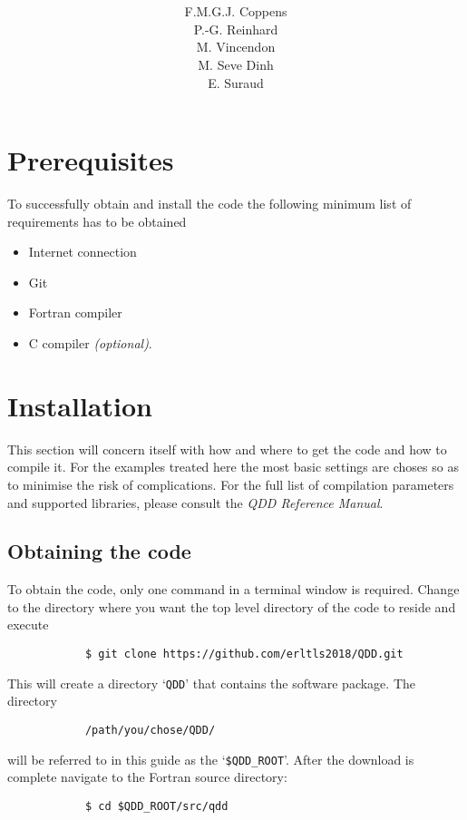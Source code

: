 \documentclass[11pt,a4paper]{article}
\title{\fontsize{50}{60}\selectfont{Quantum Dissipative Dynamics}\\\vspace{7ex}\fontsize{50}{60}\selectfont{\textsf{User manual}}\vspace{8ex}}
\author{F.M.G.J. Coppens\\P.-G. Reinhard\\M. Vincendon\\M. Seve Dinh\\E. Suraud}
\begin{document}
	\maketitle
	\thispagestyle{empty}
	\newpage
	\begingroup
		\hypersetup{hidelinks}
		\tableofcontents
	\endgroup
	\newpage

	\section{Prerequisites}
		To successfully obtain and install the code the following minimum list of requirements has to be obtained
		\begin{itemize}
			\item Internet connection
			\item Git
			\item Fortran compiler
			\item C compiler \textit{(optional)}.
		\end{itemize}	

	\section{Installation}	
		This section will concern itself with how and where to get the code and how to compile it. For the examples treated here the most basic settings are choses so as to minimise the risk of complications. For the full list of compilation parameters and supported libraries, please consult the \textit{QDD Reference Manual}.
		\subsection{Obtaining the code}
			To obtain the code, only one command in a terminal window is required. Change to the directory where you want the top level directory of the code to reside and execute
		\begin{verbatim}
			$ git clone https://github.com/erltls2018/QDD.git
		\end{verbatim}
		This will create a directory `\texttt{QDD}' that contains the software package. The directory
		\begin{verbatim}
			/path/you/chose/QDD/
		\end{verbatim}
		will be referred to in this guide as the `\texttt{\$QDD\_ROOT}'. After the download is complete navigate to the Fortran source directory:
		\begin{verbatim}
			$ cd $QDD_ROOT/src/qdd
		\end{verbatim}
		
\end{document}
